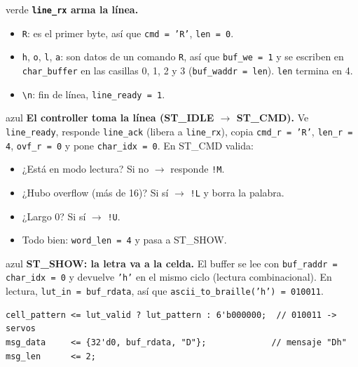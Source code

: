 \documentclass[11pt,a4paper]{article}
\newcommand{\cod}[1]{\texttt{#1}}
\begin{document}
\begin{paso}{verde}
\textbf{\cod{line\_rx} arma la línea.}
\begin{itemize}[leftmargin=*]
  \item \cod{R}: es el primer byte, así que \cod{cmd = 'R'}, \cod{len = 0}.
  \item \cod{h}, \cod{o}, \cod{l}, \cod{a}: son datos de un comando \cod{R}, así que
        \cod{buf\_we = 1} y se escriben en \cod{char\_buffer} en las casillas 0, 1, 2 y 3
        (\cod{buf\_waddr = len}). \cod{len} termina en 4.
  \item \cod{\textbackslash n}: fin de línea, \cod{line\_ready = 1}.
\end{itemize}
\begin{center}
\end{center}
\end{paso}

\begin{paso}{azul}
\textbf{El controller toma la línea (ST\_IDLE $\to$ ST\_CMD).} Ve
\cod{line\_ready}, responde \cod{line\_ack} (libera a \cod{line\_rx}), copia
\cod{cmd\_r = 'R'}, \cod{len\_r = 4}, \cod{ovf\_r = 0} y pone \cod{char\_idx = 0}.
En ST\_CMD valida:
\begin{itemize}[leftmargin=*]
  \item ¿Está en modo lectura? Si no $\to$ responde \cod{!M}.
  \item ¿Hubo overflow (más de 16)? Si sí $\to$ \cod{!L} y borra la palabra.
  \item ¿Largo 0? Si sí $\to$ \cod{!U}.
  \item Todo bien: \cod{word\_len = 4} y pasa a ST\_SHOW.
\end{itemize}
\end{paso}

\begin{paso}{azul}
\textbf{ST\_SHOW: la letra va a la celda.} El buffer se lee con
\cod{buf\_raddr = char\_idx = 0} y devuelve \cod{'h'} en el mismo ciclo (lectura
combinacional). En lectura, \cod{lut\_in = buf\_rdata}, así que
\cod{ascii\_to\_braille('h') = 010011}.
\begin{lstlisting}
cell_pattern <= lut_valid ? lut_pattern : 6'b000000;  // 010011 -> servos
msg_data     <= {32'd0, buf_rdata, "D"};             // mensaje "Dh"
msg_len      <= 2;
\end{lstlisting}
\end{paso}
\end{document}

